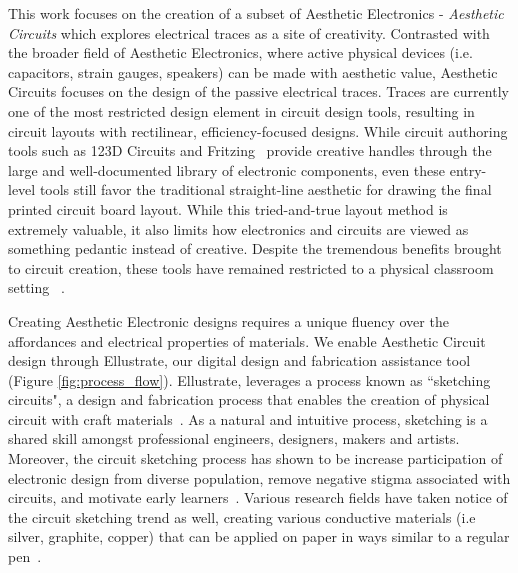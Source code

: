 \documentclass{sigchi}
\begin{document}
This work focuses on the creation of a subset of Aesthetic Electronics - \textit{Aesthetic Circuits} which explores electrical traces as a site of creativity.
Contrasted with the broader field of Aesthetic Electronics, where active physical devices (i.e. capacitors, strain gauges, speakers) can be made with aesthetic value, Aesthetic Circuits focuses on the design of the passive electrical traces. 
Traces are currently one of the most restricted design element in circuit design tools, resulting in circuit layouts with rectilinear, efficiency-focused designs.
While circuit authoring tools such as 123D Circuits and Fritzing~\cite{_autodesk123d_2016} provide creative handles through the large and well-documented library of electronic components, even these entry-level tools still favor the traditional straight-line aesthetic for drawing the final printed circuit board layout.
While this tried-and-true layout method is extremely valuable, it also limits how electronics and circuits are viewed as something pedantic instead of creative. 
Despite the tremendous benefits brought to circuit creation, these tools have remained restricted to a physical classroom setting ~\cite{qi_stickers_2015,qi_sketching_2014}.   
    
Creating Aesthetic Electronic designs requires a unique fluency over the affordances and electrical properties of materials.
We enable Aesthetic Circuit design through Ellustrate, our digital design and fabrication assistance tool (Figure \ref{fig:process_flow}). Ellustrate, leverages a process known as ``sketching circuits", a design and fabrication process that enables the creation of physical circuit with craft materials~\cite{qi_sketching_2014}. As a natural and intuitive process, sketching is a shared skill amongst professional engineers, designers, makers and artists. Moreover, the circuit sketching process has shown to be increase participation of electronic design from diverse population, remove negative stigma associated with circuits, and motivate early learners~\cite{qi_stickers_2015}. Various research fields have taken notice of the circuit sketching trend as well, creating various conductive materials (i.e silver, graphite, copper) that can be applied on paper in ways similar to a regular pen~\cite{russo2011pen,Anonymous:ojhPyGTN}. 
\end{document}
